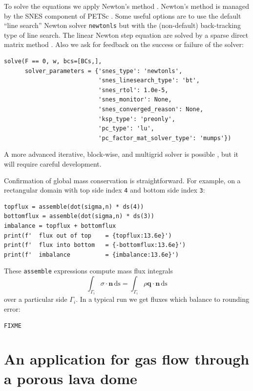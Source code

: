 \documentclass[11pt]{amsart}
\newcommand{\bn}{\mathbf{n}}
\newcommand{\bq}{\mathbf{q}}
\newcommand{\ds}{\mathrm{ds}}
\begin{document}
To solve the equations we apply Newton's method \citep{Kelley2003}.  Newton's method is managed by the SNES component of PETSc \citep{Balay2023}.  Some useful options are to use the default ``line search'' Newton solver \texttt{newtonls} but with the (non-default) back-tracking type of line search.  The linear Newton step equation are solved by a sparse direct matrix method \citep{Amestoy2001}.  Also we ask for feedback on the success or failure of the solver:
\begin{Verbatim}[fontsize=\small,frame=lines]
solve(F == 0, w, bcs=[BCs,],
      solver_parameters = {'snes_type': 'newtonls',
                           'snes_linesearch_type': 'bt',
                           'snes_rtol': 1.0e-5,
                           'snes_monitor': None,
                           'snes_converged_reason': None,
                           'ksp_type': 'preonly',
                           'pc_type': 'lu',
                           'pc_factor_mat_solver_type': 'mumps'})
\end{Verbatim}
A more advanced iterative, block-wise, and multigrid solver is possible \citep[e.g.][]{Bueler2021}, but it will require careful development.

Confirmation of global mass conservation is straightforward.  For example, on a rectangular domain with top side index \verb|4| and bottom side index \verb|3|:
\begin{Verbatim}[fontsize=\small,frame=lines]
topflux = assemble(dot(sigma,n) * ds(4))
bottomflux = assemble(dot(sigma,n) * ds(3))
imbalance = topflux + bottomflux
print(f'  flux out of top    = {topflux:13.6e}')
print(f'  flux into bottom   = {-bottomflux:13.6e}')
print(f'  imbalance          = {imbalance:13.6e}')
\end{Verbatim}
These \verb|assemble| expressions compute mass flux integrals
    $$\int_{\Gamma_i} \sigma\cdot \bn\,\ds = \int_{\Gamma_i} \rho \bq\cdot \bn\,\ds$$
over a particular side $\Gamma_i$.  In a typical run we get fluxes which balance to rounding error:
\begin{Verbatim}[fontsize=\small,frame=leftline]
FIXME
\end{Verbatim}


\section{An application for gas flow through a porous lava dome}
\end{document}
